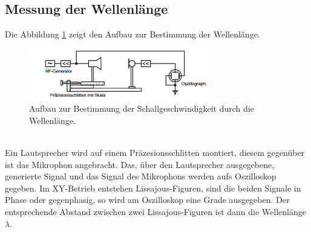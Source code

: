 \subsection{Messung der Wellenlänge}
Die Abbildung \ref{fig:schall} zeigt den Aufbau zur Bestimmung der Wellenlänge.
\begin{figure}
 \centering
 \includegraphics[width=0.7\textwidth]{schall.png}
 \caption{Aufbau zur Bestimmung der Schallgeschwindigkeit durch die Wellenlänge. \cite{skript}}
 \label{fig:schall}
 \end{figure}\\
Ein Lautsprecher wird auf einem Präzesionsschlitten montiert, diesem gegenüber ist das Mikrophon angebracht.
Das, über den Lautsprecher ausgegebene, generierte Signal und das Signal des Mikrophons werden aufs Oszilloskop gegeben.
Im XY-Betrieb entstehen Lissajous-Figuren, sind die beiden Signale in Phase oder gegenphasig,
so wird am Oszilloskop eine Grade ausgegeben.
Der entsprechende Abstand zwischen zwei Lissajous-Figuren ist dann die Wellenlänge $\lambda$.
